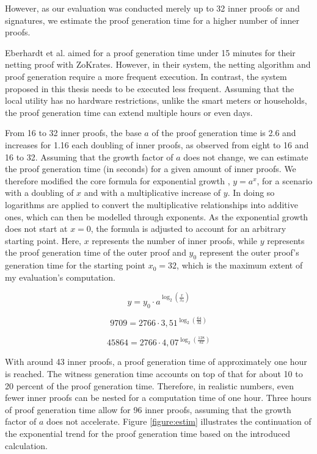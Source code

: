However, as our evaluation was conducted merely up to 32 inner proofs or and signatures, we estimate the proof generation time for a higher number of inner proofs.   

Eberhardt et al. \cite{Netting} aimed for a proof generation time under 15 minutes for their netting proof with ZoKrates. However, in their system, the netting algorithm and proof generation require a more frequent execution. In contrast, the system proposed in this thesis needs to be executed less frequent. Assuming that the local utility has no hardware restrictions, unlike the smart meters or households, the proof generation time can extend multiple hours or even days. 

From 16 to 32 inner proofs, the base \( a \) of the proof generation time is 2.6 and increases for 1.16 each doubling of inner proofs, as observed from eight to 16 and 16 to 32. Assuming that the growth factor of \( a \) does not change, we can estimate the proof generation time (in seconds) for a given amount of inner proofs. We therefore modified the core formula for exponential growth , \( y = a^x \), for a scenario with a doubling of \( x \) and with a multiplicative increase of \( y \). In doing so logarithms are applied to convert the multiplicative relationships into additive ones, which can then be modelled through exponents. As the exponential growth does not start at \( x = 0 \), the formula is adjusted to account for an arbitrary starting point. Here, \( x \) represents the number of inner proofs, while \( y \) represents the proof generation time of the outer proof and \( y_0 \) represent the outer proof's generation time for the starting point \( x_0 = 32\), which is the maximum extent of my evaluation's computation.
 

\[
y = y_0 \cdot a^{\log_2\left(\frac{x}{x_0}\right)}
\]

\[
9709 = 2766 \cdot 3,51^{\log_2\left(\frac{64}{32}\right)}
\]

\[
45864 = 2766 \cdot 4,07^{\log_2\left(\frac{128}{32}\right)}
\]



With around 43 inner proofs, a proof generation time of approximately one hour is reached. The witness generation time accounts on top of that for about 10 to 20 percent of the proof generation time. Therefore, in realistic numbers, even fewer inner proofs can be nested for a computation time of one hour. Three hours of proof generation time allow for 96 inner proofs, assuming that the growth factor of \( a \) does not accelerate. Figure \ref{figure:estim} illustrates the continuation of the exponential trend for the proof generation time based on the introduced calculation.

